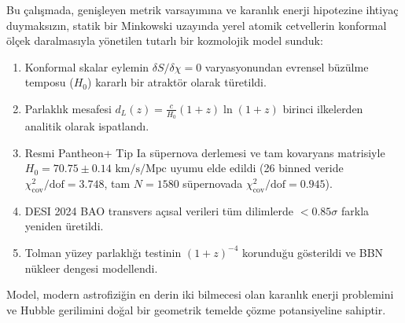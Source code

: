 \documentclass[11pt,a4paper]{article}
\begin{document}
Bu çalışmada, genişleyen metrik varsayımına ve karanlık enerji hipotezine ihtiyaç duymaksızın, statik bir Minkowski uzayında yerel atomik cetvellerin konformal ölçek daralmasıyla yönetilen tutarlı bir kozmolojik model sunduk:
\begin{enumerate}
    \item Konformal skalar eylemin $\delta S / \delta \chi = 0$ varyasyonundan evrensel büzülme temposu ($H_0$) kararlı bir atraktör olarak türetildi.
    \item Parlaklık mesafesi $d_L(z) = \frac{c}{H_0} (1+z) \ln(1+z)$ birinci ilkelerden analitik olarak ispatlandı.
    \item Resmi Pantheon+ Tip Ia süpernova derlemesi ve tam kovaryans matrisiyle $H_0 = 70.75 \pm 0.14\text{ km/s/Mpc}$ uyumu elde edildi (26 binned veride $\chi^2_{\mathrm{cov}}/\text{dof} = 3.748$, tam $N=1580$ süpernovada $\chi^2_{\mathrm{cov}}/\text{dof} = 0.945$).
    \item DESI 2024 BAO transvers açısal verileri tüm dilimlerde $< 0.85\sigma$ farkla yeniden üretildi.
    \item Tolman yüzey parlaklığı testinin $(1+z)^{-4}$ korunduğu gösterildi ve BBN nükleer dengesi modellendi.
\end{enumerate}

Model, modern astrofiziğin en derin iki bilmecesi olan karanlık enerji problemini ve Hubble gerilimini doğal bir geometrik temelde çözme potansiyeline sahiptir.
\end{document}
